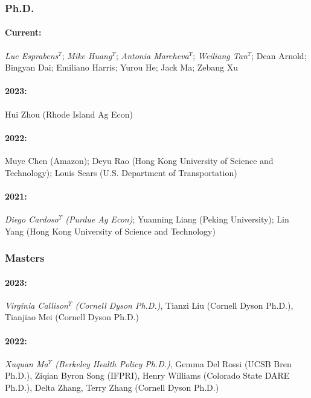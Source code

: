 \documentclass[12pt]{res} %
\begin{document}
\begin{resume}
\subsubsection{Ph.D.}\vspace{-.2in}
\paragraph{Current:} \textit{Luc Esprabens}$^\Upsilon$; \textit{Mike Huang}$^\Upsilon$; \textit{Antonia Marcheva}$^\Upsilon$; \textit{Weiliang Tan}$^\Upsilon$; Dean Arnold; Bingyan Dai; Emiliano Harris; Yurou He; Jack Ma; Zebang Xu
\vspace{-.35in}
\paragraph{2023:} Hui Zhou (Rhode Island Ag Econ)
\vspace{-.35in}
\paragraph{2022:} Muye Chen (Amazon); Deyu Rao (Hong Kong University of Science and Technology); Louis Sears (U.S. Department of Transportation)
\vspace{-.35in}
\paragraph{2021:} \textit{Diego Cardoso$^\Upsilon$ (Purdue Ag Econ)}; Yuanning Liang (Peking University); Lin Yang (Hong Kong University of Science and Technology)

\vspace{-.2in}
 
\subsubsection{Masters}\vspace{-.2in}
\paragraph{2023:} \textit{Virginia Callison$^\Upsilon$ (Cornell Dyson Ph.D.)}, Tianzi Liu (Cornell Dyson Ph.D.), Tianjiao Mei (Cornell Dyson Ph.D.)
\vspace{-.35in} 
\paragraph{2022:} \textit{Xuquan Ma$^\Upsilon$ (Berkeley Health Policy Ph.D.)}, Gemma Del Rossi (UCSB Bren Ph.D.), Ziqian Byron Song (IFPRI), Henry Williams (Colorado State DARE Ph.D.), Delta Zhang, Terry Zhang (Cornell Dyson Ph.D.)
\vspace{-.35in}

\end{resume}
\end{document}

